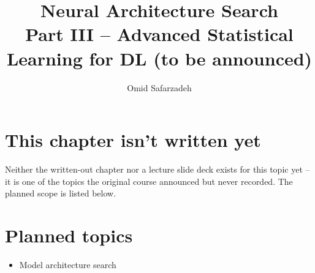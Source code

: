 \documentclass[11pt]{article}
\title{Neural Architecture Search \\ \large Part III -- Advanced Statistical Learning for DL (to be announced)}
\author{Omid Safarzadeh}
\date{}
\begin{document}
\maketitle

\section*{This chapter isn't written yet}
Neither the written-out chapter nor a lecture slide deck exists for this
topic yet -- it is one of the topics the original course announced but
never recorded. The planned scope is listed below.




\section*{Planned topics}
\begin{itemize}
  \item Model architecture search
\end{itemize}
\end{document}
